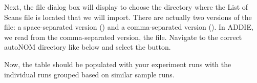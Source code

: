\noindent{}

Next, the file dialog box will display to choose the directory where the List of Scans file is located that we will import. There are actually two versions of the file: a space-separated version () and a comma-separated version (). In ADDIE, we read from the comma-separated version, the  file. Navigate to the correct autoNOM directory like below and select the  button.

\noindent{}

Now, the table should be populated with your experiment runs with the individual runs grouped based on similar sample runs. 

